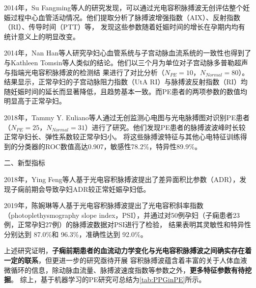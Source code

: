 2014年，Su Fangming等人\cite{Su2014}的研究发现，可以通过光电容积脉搏波无创评估整个妊娠过程中心血管活动情况。他们提取分析了脉搏波增强指数（AIX）、反射指数（RI）、传导时间（PTT）等，
发现这些参数随着妊娠时间的增长在孕期内均有统计意义上的明显改变。

2014年，Nan Han等人\cite{Han2014}研究孕妇心血管系统与子宫动脉血流系统的一致性也得到了与Kathleen Tomsin等人\cite{Tomsin2012}类似的结论。他们以三个月为单位对子宫动脉多普勒超声与指端光电容积脉搏波的检测结
果进行了对比分析（$N_{PE}=10$，$N_{Normal}=80$）。结果显示，正常孕妇的子宫动脉阻力指数（UtA RI）与脉搏波反射指数（RI）均随妊娠时间的延长而显著降低，且趋势基本一致。而PE患者的两项参数的数值均明显高于正常孕妇。

2018年，Tammy Y. Euliano等人\cite{Euliano2018}通过无创监测心电图与光电脉搏图对识别PE患者（$N_{PE}=25$，$N_{Normal}=31$）进行了研究。他们发现PE患者的脉搏波波峰时长较正常孕妇长、弹性系数较正常孕妇小。
将这些脉搏波特征与其他心电特征训练得到的分类器的ROC数值高达0.907，敏感性78.2\%，特异性89.9\%。

二、新型指标

2018年，Ying Feng等人\cite{Feng2018}基于光电容积脉搏波提出了差异面积比参数（ADR），发现子痫前期会导致孕妇ADR较正常妊娠孕妇低。

2019年，陈婉琳等人\cite{Chen2019}基于光电容积脉搏波提出了光电容积斜率指数（photoplethysmography slope index，PSI），并通过对50例孕妇（子痫患者23例，正常孕妇27例）的脉搏波数据对PSI进行了检验，
结果表明其灵敏性和特异性分别达到 87.0\%和 96.3\%，准确性达到 92.0\%。

上述研究证明，\textbf{子痫前期患者的血流动力学变化与光电容积脉搏波之间确实存在着一定的联系}，但更进一步的研究亟待开展
容积脉搏波蕴含着丰富的关于人体血液微循环的信息，除动脉血流量、脉搏波速度指数等参数之外，\textbf{更多特征参数有待挖掘}。
综上，基于机器学习的PE研究可总结为\autoref{tab:PPGinPE}所示。

